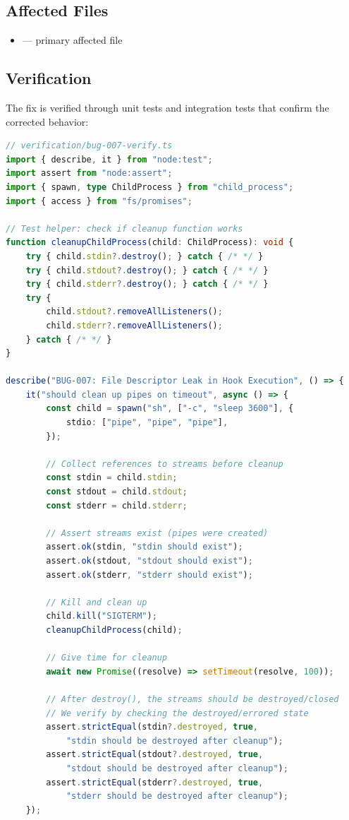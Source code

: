 \subsection*{Affected Files}
\begin{itemize}
    \item {} — primary affected file
\end{itemize}

\subsection*{Verification}
The fix is verified through unit tests and integration tests that confirm the corrected behavior:

\begin{lstlisting}[language=TypeScript]
// verification/bug-007-verify.ts
import { describe, it } from "node:test";
import assert from "node:assert";
import { spawn, type ChildProcess } from "child_process";
import { access } from "fs/promises";

// Test helper: check if cleanup function works
function cleanupChildProcess(child: ChildProcess): void {
    try { child.stdin?.destroy(); } catch { /* */ }
    try { child.stdout?.destroy(); } catch { /* */ }
    try { child.stderr?.destroy(); } catch { /* */ }
    try {
        child.stdout?.removeAllListeners();
        child.stderr?.removeAllListeners();
    } catch { /* */ }
}

describe("BUG-007: File Descriptor Leak in Hook Execution", () => {
    it("should clean up pipes on timeout", async () => {
        const child = spawn("sh", ["-c", "sleep 3600"], {
            stdio: ["pipe", "pipe", "pipe"],
        });

        // Collect references to streams before cleanup
        const stdin = child.stdin;
        const stdout = child.stdout;
        const stderr = child.stderr;

        // Assert streams exist (pipes were created)
        assert.ok(stdin, "stdin should exist");
        assert.ok(stdout, "stdout should exist");
        assert.ok(stderr, "stderr should exist");

        // Kill and clean up
        child.kill("SIGTERM");
        cleanupChildProcess(child);

        // Give time for cleanup
        await new Promise((resolve) => setTimeout(resolve, 100));

        // After destroy(), the streams should be destroyed/closed
        // We verify by checking the destroyed/errored state
        assert.strictEqual(stdin?.destroyed, true,
            "stdin should be destroyed after cleanup");
        assert.strictEqual(stdout?.destroyed, true,
            "stdout should be destroyed after cleanup");
        assert.strictEqual(stderr?.destroyed, true,
            "stderr should be destroyed after cleanup");
    });


\end{lstlisting}
